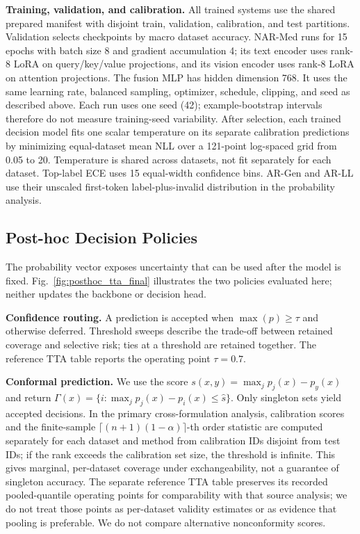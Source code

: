 \textbf{Training, validation, and calibration.} All trained systems use the shared prepared manifest with disjoint train, validation, calibration, and test partitions. Validation selects checkpoints by macro dataset accuracy. NAR-Med runs for 15 epochs with batch size 8 and gradient accumulation 4; its text encoder uses rank-8 LoRA on query/key/value projections, and its vision encoder uses rank-8 LoRA on attention projections. The fusion MLP has hidden dimension 768. It uses the same learning rate, balanced sampling, optimizer, schedule, clipping, and seed as described above. Each run uses one seed (42); example-bootstrap intervals therefore do not measure training-seed variability. After selection, each trained decision model fits one scalar temperature on its separate calibration predictions by minimizing equal-dataset mean NLL over a 121-point log-spaced grid from 0.05 to 20. Temperature is shared across datasets, not fit separately for each dataset. Top-label ECE uses 15 equal-width confidence bins. AR-Gen and AR-LL use their unscaled first-token label-plus-invalid distribution in the probability analysis.

\subsection{Post-hoc Decision Policies}
\label{sec:posthoc-method}
The probability vector exposes uncertainty that can be used after the model is fixed. Fig.~\ref{fig:posthoc_tta_final} illustrates the two policies evaluated here; neither updates the backbone or decision head.

\textbf{Confidence routing.} A prediction is accepted when $\max(p)\geq\tau$ and otherwise deferred. Threshold sweeps describe the trade-off between retained coverage and selective risk; ties at a threshold are retained together. The reference TTA table reports the operating point $\tau=0.7$.

\textbf{Conformal prediction.} We use the score $s(x,y)=\max_j p_j(x)-p_y(x)$ and return $\Gamma(x)=\{i:\max_j p_j(x)-p_i(x)\leq\hat{s}\}$. Only singleton sets yield accepted decisions. In the primary cross-formulation analysis, calibration scores and the finite-sample $\lceil(n+1)(1-\alpha)\rceil$-th order statistic are computed separately for each dataset and method from calibration IDs disjoint from test IDs; if the rank exceeds the calibration set size, the threshold is infinite. This gives marginal, per-dataset coverage under exchangeability, not a guarantee of singleton accuracy. The separate reference TTA table preserves its recorded pooled-quantile operating points for comparability with that source analysis; we do not treat those points as per-dataset validity estimates or as evidence that pooling is preferable. We do not compare alternative nonconformity scores.

